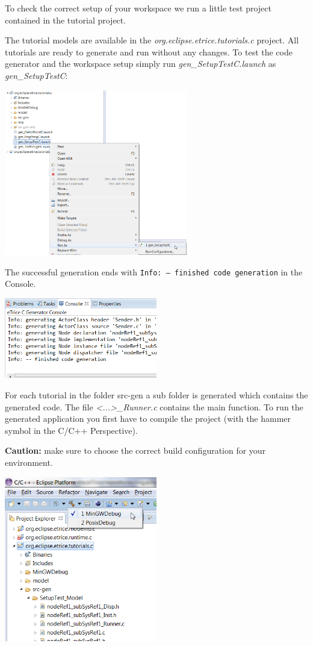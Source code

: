 To check the correct setup of your workspace we run a little test project contained in the tutorial project.

The tutorial models are available in the  \emph{org.eclipse.etrice.tutorials.c} project. All tutorials are ready to generate and run without any changes. To test the code generator and the workspace setup simply run 
\emph{gen\_SetupTestC.launch} as \emph{gen\_SetupTestC}: 

\includegraphics[width=0.6\textwidth]{images/014-05-gen_SetupTestC.png}

The successful generation ends with \texttt{Info: -- finished code generation} in the Console.

\includegraphics[width=0.5\textwidth]{images/014-06-FinishedCodeGeneration.png}

For each tutorial in the folder src-gen a sub folder is generated which contains the generated code. The file \emph{<...>\_Runner.c} contains the main function. To run the generated application you first have to compile the project (with the hammer symbol in the C/C++ Perspective).

\textbf{Caution:} make sure to choose the correct build configuration for your environment.

\includegraphics[width=0.5\textwidth]{images/014-07-Compile.png}


